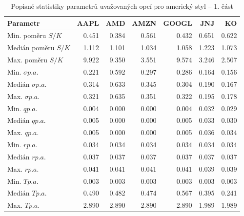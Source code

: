 \documentclass[male,czech,api_bc]{kitheses}
\begin{document}
  \begin{table}[h!]
    \centering
    \caption{Popisné statistiky parametrů uvažovaných opcí pro americký styl -- 1. část}
    \label{tab:descriptive_american_1}
    \begin{tabular}{lrrrrrr}
      \toprule
      Parametr & AAPL & AMD & AMZN & GOOGL & JNJ & KO \\
      \midrule
      Min. poměru $S/K$ & 0.451 & 0.384 & 0.561 & 0.432 & 0.651 & 0.622 \\
      Medián poměru $S/K$ & 1.112 & 1.101 & 1.034 & 1.058 & 1.223 & 1.073 \\
      Max. poměru $S/K$ & 9.922 & 9.350 & 3.551 & 9.574 & 3.246 & 2.507 \\
      \midrule
      Min. $\sigma p.a.$ & 0.221 & 0.592 & 0.297 & 0.286 & 0.164 & 0.156 \\
      Medián $\sigma p.a.$ & 0.314 & 0.633 & 0.345 & 0.304 & 0.190 & 0.167 \\
      Max. $\sigma p.a.$ & 0.321 & 0.635 & 0.351 & 0.322 & 0.195 & 0.178 \\
      \midrule
      Min. $q p.a.$ & 0.004 & 0.000 & 0.000 & 0.004 & 0.032 & 0.029 \\
      Medián $q p.a.$ & 0.005 & 0.000 & 0.000 & 0.005 & 0.033 & 0.030 \\
      Max. $q p.a.$ & 0.005 & 0.000 & 0.000 & 0.005 & 0.036 & 0.034 \\
      \midrule
      Min. $r p.a.$ & 0.034 & 0.034 & 0.034 & 0.034 & 0.034 & 0.034 \\
      Medián $r p.a.$ & 0.037 & 0.037 & 0.037 & 0.037 & 0.037 & 0.037 \\
      Max. $r p.a.$ & 0.041 & 0.041 & 0.041 & 0.041 & 0.039 & 0.039 \\
      \midrule
      Min. $T p.a.$ & 0.003 & 0.003 & 0.003 & 0.003 & 0.003 & 0.003 \\
      Medián $T p.a.$ & 0.490 & 0.482 & 0.474 & 0.567 & 0.395 & 0.241 \\
      Max. $T p.a.$ & 2.890 & 2.890 & 2.890 & 2.890 & 1.989 & 1.989 \\
      \bottomrule
    \end{tabular}
  \end{table}
\end{document}
